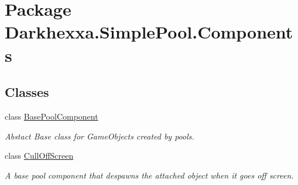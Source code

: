 \hypertarget{namespace_darkhexxa_1_1_simple_pool_1_1_components}{\section{Package Darkhexxa.\-Simple\-Pool.\-Components}
\label{namespace_darkhexxa_1_1_simple_pool_1_1_components}
}
\subsection*{Classes}
\begin{DoxyCompactItemize}
\item 
class \hyperlink{class_darkhexxa_1_1_simple_pool_1_1_components_1_1_base_pool_component}{Base\-Pool\-Component}
\begin{DoxyCompactList}\small\item\em Abstact Base class for Game\-Objects created by pools. \end{DoxyCompactList}\item 
class \hyperlink{class_darkhexxa_1_1_simple_pool_1_1_components_1_1_cull_off_screen}{Cull\-Off\-Screen}
\begin{DoxyCompactList}\small\item\em A base pool component that despawns the attached object when it goes off screen. \end{DoxyCompactList}\end{DoxyCompactItemize}
